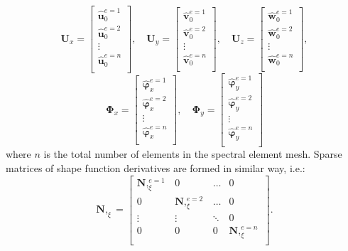 \documentclass[preprint,12pt]{elsarticle}
\renewcommand{\vec}[1]{\mathbf{#1}}
\renewcommand{\bm}[1]{\mathbf{#1}}
\newcommand{\bs}[1]{\boldsymbol{#1}}
\begin{document}
	\begin{equation}
	\vec{U}_x = \left[
	\begin{array}{c}  
	\hat{\vec{u}}_0^{e=1}  \\[2pt]
	\hat{\vec{u}}_0^{e=2} \\[2pt]
	\vdots\\[2pt]
	\hat{\vec{u}}_0^{e=n}\\[2pt]
	\end{array}\right],
	\quad
	\vec{U}_y = \left[
	\begin{array}{c}  
	\hat{\vec{v}}_0^{e=1}  \\[2pt]
	\hat{\vec{v}}_0^{e=2} \\[2pt]
	\vdots\\[2pt]
	\hat{\vec{v}}_0^{e=n}\\[2pt]
	\end{array}\right],
	\quad
	\vec{U}_z = \left[
	\begin{array}{c}  
	\hat{\vec{w}}_0^{e=1}  \\[2pt]
	\hat{\vec{w}}_0^{e=2} \\[2pt]
	\vdots\\[2pt]
	\hat{\vec{w}}_0^{e=n}\\[2pt]
	\end{array}\right],
	\end{equation}
	\begin{equation}
	\bs{\Phi}_x = \left[
	\begin{array}{c}  
	\hat{\bs{\varphi}}_x^{e=1}  \\[2pt]
	\hat{\bs{\varphi}}_x^{e=2} \\[2pt]
	\vdots\\[2pt]
	\hat{\bs{\varphi}}_x^{e=n}\\[2pt]
	\end{array}\right],
	\quad
	\bs{\Phi}_y = \left[
	\begin{array}{c}  
	\hat{\bs{\varphi}}_y^{e=1}  \\[2pt]
	\hat{\bs{\varphi}}_y^{e=2} \\[2pt]
	\vdots\\[2pt]
	\hat{\bs{\varphi}}_y^{e=n}\\[2pt]
	\end{array}\right]
	\end{equation}
	where $n$ is the total number of elements in the spectral element mesh. Sparse matrices of shape function derivatives are formed in similar way, i.e.:
	\begin{equation}
	\bm{N},_{\xi} = \left[
	\begin{array}{cccc}  
	\bm{N},_{\xi}^{e=1} & 0 & \ldots & 0\\[2pt]
	0& \bm{N},_{\xi}^{e=2}  & \ldots& 0\\[2pt]
	\vdots&\vdots&\ddots&0\\[2pt]
	0& 0 &0&\bm{N},_{\xi}^{e=n}\\[2pt]
	\end{array}\right].
	\end{equation}
\end{document}
